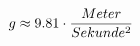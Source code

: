 \documentclass[preview]{standalone}
\begin{document}
\begin{align*}
\special{dvisvgm:raw <g id='unique000'>}g \approx 9.81 \cdot \frac{Meter}{Sekunde^{2}}\special{dvisvgm:raw </g>}
\end{align*}
\end{document}
